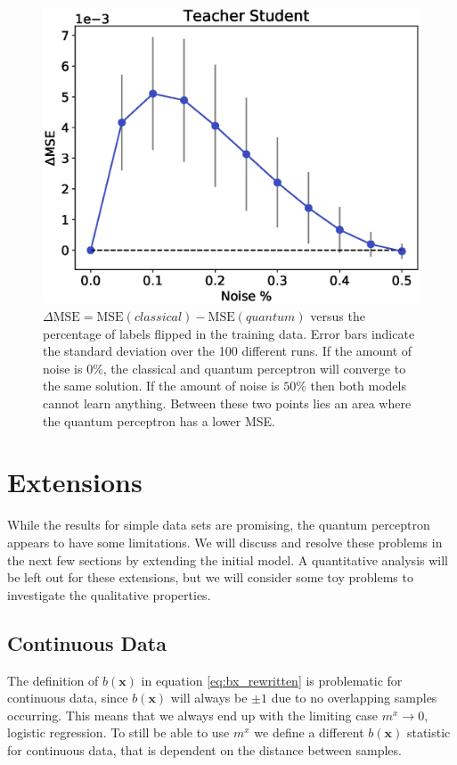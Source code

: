 \clearpage
\begin{figure}[htb!]
    \centering
    \includegraphics[width=1.1\linewidth]{figures/chapter3/delta_noise.eps}
    \caption{$\Delta\text{MSE} = \text{MSE}(classical) - \text{MSE}(quantum)$ versus the percentage of labels flipped in the training data. Error bars indicate the standard deviation over the 100 different runs. If the amount of noise is $0\%$, the classical and quantum perceptron will converge to the same solution. If the amount of noise is $50\%$ then both models cannot learn anything. Between these two points lies an area where the quantum perceptron has a lower MSE.} 
    \label{fig:lh_diff_mz}
\end{figure}

\section{Extensions}

While the results for simple data sets are promising, the quantum perceptron appears to have some limitations. We will discuss and resolve these problems in the next few sections by extending the initial model. A quantitative analysis will be left out for these extensions, but we will consider some toy problems to investigate the qualitative properties.

\subsection{Continuous Data}

The definition of $b(\mathbf{x})$ in equation \ref{eq:bx_rewritten} is problematic for continuous data, since $b(\mathbf{x})$ will always be $\pm1$ due to no overlapping samples occurring. This means that we always end up with the limiting case $m^x\to0$, logistic regression. To still be able to use $m^x$ we define a different $b(\mathbf{x})$ statistic for continuous data, that is dependent on the distance between samples.\newline

